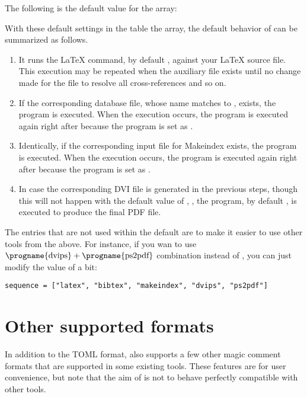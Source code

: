 \documentclass[draft]{llmk-doc}
\begin{document}
The following is the default value for the  array:
%
\begin{htcode}
\end{htcode}

With these default settings in the  table the 
array, the default behavior of  can be summarized as follows.
%
\begin{enumerate}
\item It runs the {\LaTeX} command, by default {\LuaLaTeX}, against your
  {\LaTeX} source file. This execution may be repeated when the auxiliary file
  exists until no change made for the file to resolve all cross-references and
  so on.
\item If the corresponding {\BibTeX} database file, whose name matches to
  , exists, the {\BibTeX} program is executed. When the execution
  occurs, the  program is executed again right after because
  the program is set as .
\item Identically, if the corresponding input file for Makeindex exists, the
  program is executed. When the execution occurs, the  program
  is executed again right after because the program is set as .
\item In case the corresponding DVI file is generated in the previous steps,
  though this will not happen with the default value of , \ie
  , the  program, by default ,
  is executed to produce the final PDF file.
\end{enumerate}

The entries that are not used within the default  are to make it
easier to use other tools from the above. For instance, if you wan to use
$\text{\progname{dvips}}+\text{\progname{ps2pdf}}$ combination instead of
, you can just modify the value of  a bit:
%
\begin{lstlisting}[style=toml]
sequence = ["latex", "bibtex", "makeindex", "dvips", "ps2pdf"]
\end{lstlisting}

\section{Other supported formats}
\label{sec:magic-comment}

In addition to the TOML format,  also supports a few other magic
comment formats that are supported in some existing tools. These features are
for user convenience, but note that the aim of  is not to behave
perfectly compatible with other tools.
\end{document}
